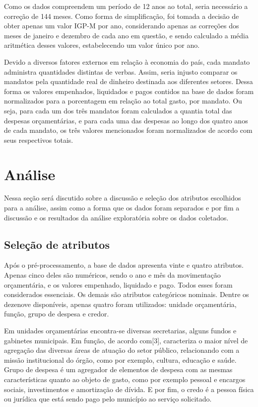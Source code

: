 \documentclass[authoryear]{elsarticle}
\begin{document}
Como os dados compreendem um período de 12 anos ao total, seria necessário a correção de 144 meses. Como forma de simplificação, foi tomada a decisão de obter apenas um valor IGP-M por ano, considerando apenas as correções dos meses de janeiro e dezembro de cada ano em questão, e sendo calculado a média aritmética desses valores, estabelecendo um valor único por ano.

Devido a diversos fatores externos em relação à economia do país, cada mandato administra quantidades distintas de verbas. Assim, seria injusto comparar os mandatos pela quantidade real de dinheiro destinada aos diferentes setores. Dessa forma os valores empenhados, liquidados e pagos contidos na base de dados foram normalizados para a porcentagem em relação ao total gasto, por mandato. Ou seja, para cada um dos três mandatos foram calculados a quantia total das despesas orçamentárias, e para cada uma das despesas ao longo dos quatro anos de cada mandato, os três valores mencionados foram normalizados de acordo com seus respectivos totais.

\section{Análise}
Nessa seção será discutido sobre a discussão e seleção dos atributos escolhidos para a análise, assim como a forma que os dados foram separados e por fim a discussão e os resultados da análise exploratória sobre os dados coletados.

\subsection{Seleção de atributos}

Após o pré-processamento, a base de dados apresenta vinte e quatro atributos. Apenas cinco deles são numéricos, sendo o ano e mês da movimentação orçamentária, e os valores empenhado, liquidado e pago. Todos esses foram considerados essenciais. Os demais são atributos categóricos nominais. Dentre os dezenove disponíveis, apenas quatro foram utilizados: unidade orçamentária, função, grupo de despesa e credor.

Em unidades orçamentárias encontra-se diversas secretarias, alguns fundos e gabinetes municipais. Em função, de acordo com[3], caracteriza o maior nível de agregação das diversas áreas de atuação do setor público, relacionando com a missão institucional do órgão,  como por exemplo, cultura, educação e saúde. Grupo de despesa é um agregador de elementos de despesa com as mesmas características quanto ao objeto de gasto, como por exemplo pessoal e encargos sociais, investimentos e amortização de dívida. E por fim, o credo é a pessoa física ou jurídica que está sendo pago pelo município ao serviço solicitado.
\end{document}
